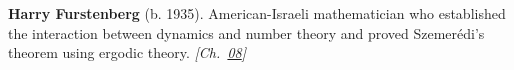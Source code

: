\textbf{Harry Furstenberg} (b. 1935). American-Israeli mathematician who established the interaction between dynamics and number theory and proved Szemer\'{e}di's theorem using ergodic theory. \emph{[Ch.~\hyperref[ch:boundedprimegaps]{08}]}

